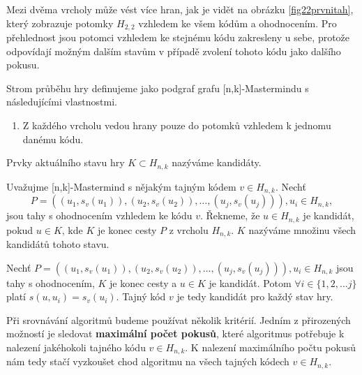 \begin{pozn}
    Mezi dvěma vrcholy může vést více hran, jak je vidět na obrázku \ref{fig22prvnitah}, který zobrazuje potomky $H_{2,2}$ vzhledem ke všem kódům a ohodnocením. Pro přehlednost jsou potomci vzhledem ke stejnému kódu zakresleny u sebe, protože odpovídají možným dalším stavům v případě zvolení tohoto kódu jako dalšího pokusu. 
    
\end{pozn}

\begin{definice}
  Strom průběhu hry definujeme jako podgraf grafu [n,k]-Mastermindu s následujícími vlastnostmi. 
  \begin{enumerate}
      \item Z každého vrcholu vedou hrany pouze do potomků vzhledem k jednomu danému kódu. 
  \end{enumerate}
\end{definice}



Prvky aktuálního stavu hry $K\subset H_{n,k}$ nazýváme kandidáty. 
\begin{definice}[Kandidát]
    Uvažujme [n,k]-Mastermind s nějakým tajným kódem $v\in H_{n,k}$. Nechť 
    \[P = \left((u_1, s_v(u_1)), (u_2,s_v(u_2)), \dots, (u_j,s_v(u_j))\right), u_i \in H_{n,k}, \]
    jsou tahy s ohodnocením vzhledem ke kódu $v$. Řekneme, že $u \in H_{n,k}$ je kandidát, pokud $u \in K$, kde $K$ je konec cesty $P$ z vrcholu $H_{n,k}$. $K$ nazýváme množinu všech kandidátů tohoto stavu. 
\end{definice}
\begin{pozn}
    Nechť $P = \left((u_1, s_v(u_1)), (u_2,s_v(u_2)), \dots, (u_j,s_v(u_j))\right), u_i \in H_{n,k}$ jsou tahy s ohodnocením, $K$ je konec cesty a $u \in K$ je kandidát. Potom $\forall i \in \{1,2,\dots j\}$ platí $s(u,u_i) = s_v(u_i)$. Tajný kód $v$ je tedy kandidát pro každý stav hry. 
\end{pozn}




Při srovnávání algoritmů budeme používat několik kritérií. Jedním z přirozených možností je sledovat \textbf{maximální počet pokusů}, které algoritmus potřebuje k nalezení jakéhokoli tajného kódu $v \in H_{n,k}$. K nalezení maximálního počtu pokusů nám tedy stačí vyzkoušet chod algoritmu na všech tajných kódech $v \in H_{n,k}$.

